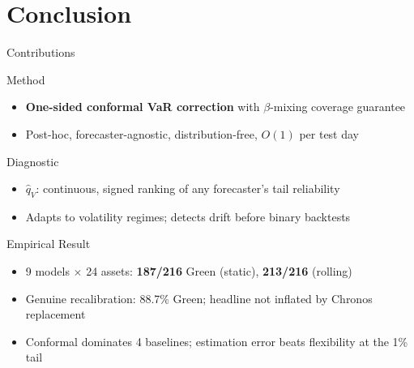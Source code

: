 \documentclass[9pt, aspectratio=169, t]{beamer}
\newcommand{\qV}{\hat{q}_V}
\begin{document}
\section{Conclusion}
\begin{frame}{Contributions}
	\vspace{-0.2cm}
	{\small
	\begin{block}{Method}
		\begin{itemize}\setlength{\itemsep}{2pt}
			\item \textbf{One-sided conformal VaR correction} with $\beta$-mixing coverage guarantee
			\item Post-hoc, forecaster-agnostic, distribution-free, $O(1)$ per test day
		\end{itemize}
	\end{block}
	\begin{exampleblock}{Diagnostic}
		\begin{itemize}\setlength{\itemsep}{2pt}
			\item $\qV$: continuous, signed ranking of any forecaster's tail reliability
			\item Adapts to volatility regimes; detects drift before binary backtests
		\end{itemize}
	\end{exampleblock}
	\begin{block}{Empirical Result}
		\begin{itemize}\setlength{\itemsep}{2pt}
			\item 9 models $\times$ 24 assets: \textcolor{Forest}{\textbf{187/216}} Green (static), \textcolor{Forest}{\textbf{213/216}} (rolling)
			\item Genuine recalibration: 88.7\% Green; headline not inflated by Chronos replacement
			\item Conformal dominates 4 baselines; estimation error beats flexibility at the 1\% tail
		\end{itemize}
	\end{block}
	}
\end{frame}
\end{document}
